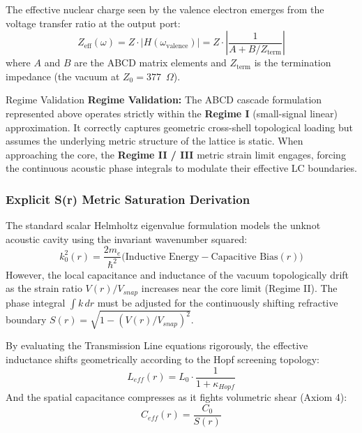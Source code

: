 The effective nuclear charge seen by the valence electron emerges from the voltage transfer ratio at the output port:
\begin{equation}
    Z_\text{eff}(\omega) = Z \cdot |H(\omega_\text{valence})| = Z \cdot \left|\frac{1}{A + B/Z_\text{term}}\right|
\end{equation}
where $A$ and $B$ are the ABCD matrix elements and $Z_\text{term}$ is the termination impedance (the vacuum at $Z_0 = 377$~$\Omega$).

\begin{resultbox}{Regime Validation}
\textbf{Regime Validation:} The ABCD cascade formulation represented above operates strictly within the \textbf{Regime I} (small-signal linear) approximation. It correctly captures geometric cross-shell topological loading but assumes the underlying metric structure of the lattice is static. When approaching the core, the \textbf{Regime II / III} metric strain limit engages, forcing the continuous acoustic phase integrals to modulate their effective LC boundaries.
\end{resultbox}

\subsubsection{Explicit S(r) Metric Saturation Derivation}
The standard scalar Helmholtz eigenvalue formulation models the unknot acoustic cavity using the invariant wavenumber squared:
\begin{equation}
    k_0^2(r) = \frac{2m_e}{\hbar^2}\bigl(\text{Inductive Energy} - \text{Capacitive Bias}(r)\bigr)
\end{equation}
However, the local capacitance and inductance of the vacuum topologically drift as the strain ratio $V(r)/V_{snap}$ increases near the core limit (Regime II). The phase integral $\int k\, dr$ must be adjusted for the continuously shifting refractive boundary $S(r) = \sqrt{1 - (V(r)/V_{snap})^2}$.

By evaluating the Transmission Line equations rigorously, the effective inductance shifts geometrically according to the Hopf screening topology:
\begin{equation}
    L_{eff}(r) = L_0 \cdot \frac{1}{1 + \kappa_{Hopf}}
\end{equation}
And the spatial capacitance compresses as it fights volumetric shear (Axiom 4):
\begin{equation}
    C_{eff}(r) = \frac{C_0}{S(r)}
\end{equation}


